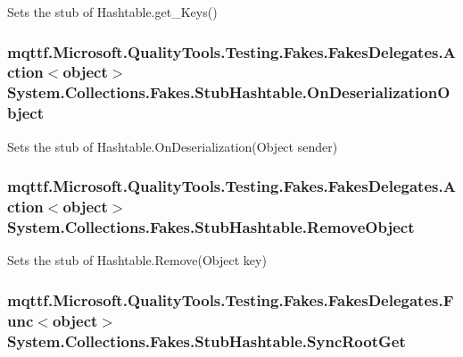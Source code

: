 Sets the stub of Hashtable.\-get\-\_\-\-Keys()

\hypertarget{class_system_1_1_collections_1_1_fakes_1_1_stub_hashtable_a953339d5018b13d8464e038c3a67fb52}{
\subsubsection[{On\-Deserialization\-Object}]{\setlength{\rightskip}{0pt plus 5cm}mqttf.\-Microsoft.\-Quality\-Tools.\-Testing.\-Fakes.\-Fakes\-Delegates.\-Action$<$object$>$ System.\-Collections.\-Fakes.\-Stub\-Hashtable.\-On\-Deserialization\-Object}}\label{class_system_1_1_collections_1_1_fakes_1_1_stub_hashtable_a953339d5018b13d8464e038c3a67fb52}


Sets the stub of Hashtable.\-On\-Deserialization(\-Object sender)

\hypertarget{class_system_1_1_collections_1_1_fakes_1_1_stub_hashtable_a1c56b12b6af2b2ee43d5e91e1e0551ed}{
\subsubsection[{Remove\-Object}]{\setlength{\rightskip}{0pt plus 5cm}mqttf.\-Microsoft.\-Quality\-Tools.\-Testing.\-Fakes.\-Fakes\-Delegates.\-Action$<$object$>$ System.\-Collections.\-Fakes.\-Stub\-Hashtable.\-Remove\-Object}}\label{class_system_1_1_collections_1_1_fakes_1_1_stub_hashtable_a1c56b12b6af2b2ee43d5e91e1e0551ed}


Sets the stub of Hashtable.\-Remove(\-Object key)

\hypertarget{class_system_1_1_collections_1_1_fakes_1_1_stub_hashtable_ab56f464f9952dee6da68a2ec844dfeab}{
\subsubsection[{Sync\-Root\-Get}]{\setlength{\rightskip}{0pt plus 5cm}mqttf.\-Microsoft.\-Quality\-Tools.\-Testing.\-Fakes.\-Fakes\-Delegates.\-Func$<$object$>$ System.\-Collections.\-Fakes.\-Stub\-Hashtable.\-Sync\-Root\-Get}}\label{class_system_1_1_collections_1_1_fakes_1_1_stub_hashtable_ab56f464f9952dee6da68a2ec844dfeab}


